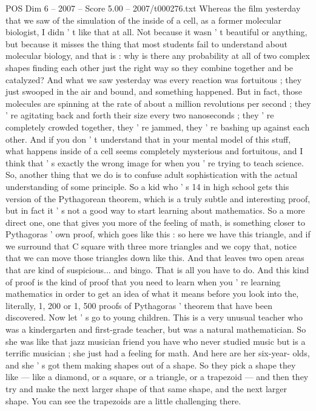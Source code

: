 \begin{textsample}{POS Dim 6 – 2007 – Score 5.00 – 2007/t000276.txt}
Whereas the film yesterday that we saw of the simulation of the inside of a cell, as a former molecular biologist, I didn ' t like that at all.
Not because it wasn ' t beautiful or anything, but because it misses the thing that most students fail to understand about molecular biology, and that is : why is there any probability at all of two complex shapes finding each other just the right way so they combine together and be catalyzed?
And what we saw yesterday was every reaction was fortuitous ; they just swooped in the air and bound, and something happened.
But in fact, those molecules are spinning at the rate of about a million revolutions per second ; they ' re agitating back and forth their size every two nanoseconds ; they ' re completely crowded together, they ' re jammed, they ' re bashing up against each other.
And if you don ' t understand that in your mental model of this stuff, what happens inside of a cell seems completely mysterious and fortuitous, and I think that ' s exactly the wrong image for when you ' re trying to teach science.
So, another thing that we do is to confuse adult sophistication with the actual understanding of some principle.
So a kid who ' s 14 in high school gets this version of the Pythagorean theorem, which is a truly subtle and interesting proof, but in fact it ' s not a good way to start learning about mathematics.
So a more direct one, one that gives you more of the feeling of math, is something closer to Pythagoras ' own proof, which goes like this : so here we have this triangle, and if we surround that C square with three more triangles and we copy that, notice that we can move those triangles down like this.
And that leaves two open areas that are kind of suspicious... and bingo.
That is all you have to do.
And this kind of proof is the kind of proof that you need to learn when you ' re learning mathematics in order to get an idea of what it means before you look into the, literally, 1, 200 or 1, 500 proofs of Pythagoras ' theorem that have been discovered.
Now let ' s go to young children.
This is a very unusual teacher who was a kindergarten and first-grade teacher, but was a natural mathematician.
So she was like that jazz musician friend you have who never studied music but is a terrific musician ; she just had a feeling for math.
And here are her six-year- olds, and she ' s got them making shapes out of a shape.
So they pick a shape they like — like a diamond, or a square, or a triangle, or a trapezoid — and then they try and make the next larger shape of that same shape, and the next larger shape.
You can see the trapezoids are a little challenging there.

\end{textsample}
